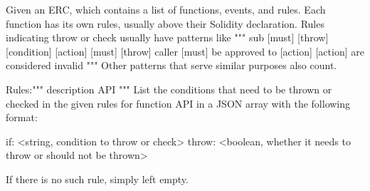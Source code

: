 Given an ERC, which contains a list of functions, events, and rules. Each function has its own rules, usually above their Solidity declaration. Rules indicating throw or check usually have patterns like
"""
{sub} [must] [throw] [condition] 
[action] [must] [throw]
caller [must] be approved to [action]
[action] are considered invalid
"""
Other patterns that serve similar purposes also count.

Rules:"""
{{description}}
{{API}}
"""
List the conditions that need to be thrown or checked in the given rules for function {{API}} in a JSON array with the following format:

if: <string, condition to throw or check>
throw: <boolean, whether it needs to throw or should not be thrown>

If there is no such rule, simply left empty.
